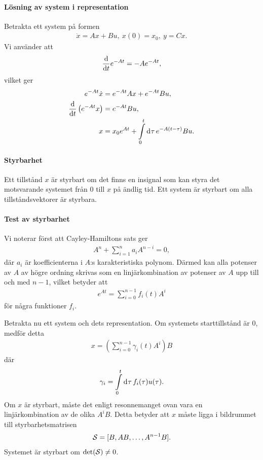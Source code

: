 \paragraph{Lösning av system i representation}
Betrakta ett system på formen
\begin{align*}
	\dot{x} = Ax + Bu,\ x(0) = x_{0},\ y = Cx.
\end{align*}
Vi använder att
\begin{align*}
	\dv{t}e^{-At} = -Ae^{-At},
\end{align*}
vilket ger
\begin{align*}
	e^{-At}\dot{x}              &= e^{-At}Ax + e^{-At}Bu, \\
	\dv{t}\left(e^{-At}x\right) &= e^{-At}Bu, \\
	x                           &= x_{0}e^{At} + \integ{0}{t}{\tau}{e^{-A(t - \tau)}Bu}.
\end{align*}

\paragraph{Styrbarhet}
Ett tillstånd $x$ är styrbart om det finns en insignal som kan styra det motsvarande systemet från $0$ till $x$ på ändlig tid. Ett system är styrbart om alla tillståndsvektorer är styrbara.

\paragraph{Test av styrbarhet}
Vi noterar först att Cayley-Hamiltons sats ger
\begin{align*}
	A^{n} + \sum\limits_{i = 1}^{n}a_{i}A^{n - i} = 0,
\end{align*}
där $a_{i}$ är koefficienterna i $A$:s karakteristiska polynom. Därmed kan alla potenser av $A$ av högre ordning skrivas som en linjärkombination av potenser av $A$ upp till och med $n - 1$, vilket betyder att
\begin{align*}
	e^{At} = \sum\limits_{i = 0}^{n - 1}f_{i}(t)A^{i}
\end{align*}
för några funktioner $f_{i}$.

Betrakta nu ett system och dets representation. Om systemets starttillstånd är $0$, medför detta
\begin{align*}
	x = \left(\sum\limits_{i = 0}^{n - 1}\gamma_{i}(t)A^{i}\right)B
\end{align*}
där
\begin{align*}
	\gamma_{i} = \integ{0}{t}{\tau}{f_{i}(\tau)u(\tau)}.
\end{align*}
Om $x$ är styrbart, måste det enligt resonnemanget ovan vara en linjärkombination av de olika $A^{i}B$. Detta betyder att $x$ måste ligga i bildrummet till styrbarhetsmatrisen
\begin{align*}
	\S = [B, AB, \dots, A^{n - 1}B].
\end{align*}
Systemet är styrbart om $\det(\S) \neq 0$.

